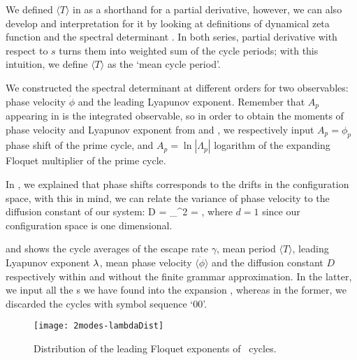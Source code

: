 {{{We defined $\langle T \rangle$ in  as a shorthand for a partial
derivative, however, we can also develop and interpretation for it by looking at
definitions of dynamical zeta function  and the spectral 
determinant . In both series, partial derivative with
respect to $s$ turns them into weighted sum of the cycle periods; with this intuition, 
we define $\langle T \rangle$ as the `mean cycle period'.

We constructed the spectral determinant  at different 
orders for two observables: phase velocity $\dot{\phi}$ and the leading Lyapunov 
exponent. Remember that $A_p$ appearing in  is the
integrated observable, so in order to obtain the moments of phase velocity and
Lyapunov exponent from  and , we respectively input 
$A_p = \phi_p$ phase shift of the prime cycle, and $A_p = \ln |\Lambda_p|$ logarithm
of the expanding Floquet multiplier of the prime cycle. 

In , we explained that  phase shifts corresponds to 
the drifts in the configuration space, with this in mind, we can relate the 
variance of phase velocity to the diffusion constant of our system:
\beq
    D =  \sigma_{\dot{\phi}}^2 
      =  ,
\eeq
where $d=1$ since our configuration space is one dimensional. 

 and  shows
the cycle averages of the escape rate $\gamma$, mean period $\langle T \rangle$,
leading Lyapunov exponent $\lambda$, mean phase velocity $\langle \dot{\phi} \rangle$
and the diffusion constant $D$ respectively within and without the finite grammar 
approximation. In the latter, we input all the \rpo s we have found into the expansion
, whereas in the former, we discarded the cycles
with symbol sequence `00'.




\begin{figure}%
\centering
 \texttt{[image: 2modes-lambdaDist]}
\caption{Distribution of the leading Floquet exponents of \twomode\ cycles.}
\label{f-2modes-lambdaDist}
\end{figure}

}}}
